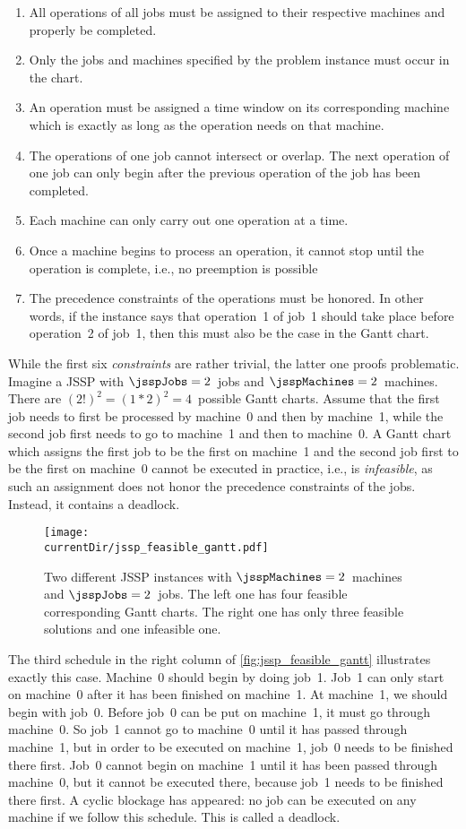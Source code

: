 \begin{enumerate}
%
\item All operations of all jobs must be assigned to their respective machines and properly be completed.%
%
\item Only the jobs and machines specified by the problem instance must occur in the chart.%
%
\item An operation must be assigned a time window on its corresponding machine which is exactly as long as the operation needs on that machine.%
%
\item The operations of one job cannot intersect or overlap. %
The next operation of one job can only begin after the previous operation of the job has been completed.%
%
\item Each machine can only carry out one operation at a time.%
%
\item Once a machine begins to process an operation, it cannot stop until the operation is complete, i.e., no preemption is possible%
%
\item The precedence constraints of the operations must be honored. %
In other words, if the instance says that operation~1 of job~1 should take place before operation~2 of job~1, then this must also be the case in the Gantt chart.%
%
\end{enumerate}%
%
While the first six \emph{constraints} are rather trivial, the latter one proofs problematic.
Imagine a \gls{JSSP} with $\jsspJobs=2$~jobs and $\jsspMachines=2$~machines.
There are $(2!)^2=(1*2)^2=4$~possible Gantt charts.
Assume that the first job needs to first be processed by machine~0 and then by machine~1, while the second job first needs to go to machine~1 and then to machine~0.
A Gantt chart which assigns the first job to be the first on machine~1 and the second job first to be the first on machine~$0$ cannot be executed in practice, i.e., is \emph{infeasible}, as such an assignment does not honor the precedence constraints of the jobs.
Instead, it contains a deadlock.

\begin{figure}%
\centering%
\texttt{[image: \\currentDir/jssp\_feasible\_gantt.pdf]}%
\caption{Two different JSSP instances with $\jsspMachines=2$~machines and $\jsspJobs=2$~jobs.%
The left one has four feasible corresponding Gantt charts.
The right one has only three feasible solutions and one infeasible one.}%
\label{fig:jssp_feasible_gantt}%
\end{figure}%

The third schedule in the right column of \autoref{fig:jssp_feasible_gantt} illustrates exactly this case.
Machine~0 should begin by doing job~1.
Job~1 can only start on machine~0 after it has been finished on machine~1.
At machine~1, we should begin with job~0.
Before job~0 can be put on machine~1, it must go through machine~0.
So job~1 cannot go to machine~0 until it has passed through machine~1, but in order to be executed on machine~1, job~0 needs to be finished there first.
Job~0 cannot begin on machine~1 until it has been passed through machine~0, but it cannot be executed there, because job~1 needs to be finished there first.
A cyclic blockage has appeared: no job can be executed on any machine if we follow this schedule.
This is called a deadlock.


